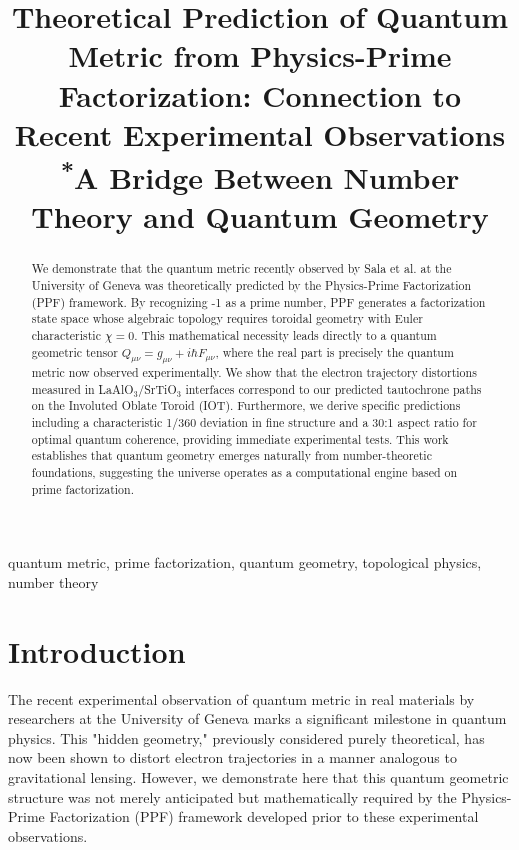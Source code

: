 \documentclass[conference]{IEEEtran}
\begin{document}
\title{Theoretical Prediction of Quantum Metric from Physics-Prime Factorization: Connection to Recent Experimental Observations\\
{\footnotesize \textsuperscript{*}A Bridge Between Number Theory and Quantum Geometry}
}

\author{
}

\maketitle

\begin{abstract}
We demonstrate that the quantum metric recently observed by Sala et al. at the University of Geneva was theoretically predicted by the Physics-Prime Factorization (PPF) framework. By recognizing -1 as a prime number, PPF generates a factorization state space whose algebraic topology requires toroidal geometry with Euler characteristic $\chi = 0$. This mathematical necessity leads directly to a quantum geometric tensor $Q_{\mu\nu} = g_{\mu\nu} + i\hbar F_{\mu\nu}$, where the real part is precisely the quantum metric now observed experimentally. We show that the electron trajectory distortions measured in LaAlO$_3$/SrTiO$_3$ interfaces correspond to our predicted tautochrone paths on the Involuted Oblate Toroid (IOT). Furthermore, we derive specific predictions including a characteristic 1/360 deviation in fine structure and a 30:1 aspect ratio for optimal quantum coherence, providing immediate experimental tests. This work establishes that quantum geometry emerges naturally from number-theoretic foundations, suggesting the universe operates as a computational engine based on prime factorization.
\end{abstract}

\begin{IEEEkeywords}
quantum metric, prime factorization, quantum geometry, topological physics, number theory
\end{IEEEkeywords}

\section{Introduction}

The recent experimental observation of quantum metric in real materials by researchers at the University of Geneva \cite{sala2025} marks a significant milestone in quantum physics. This "hidden geometry," previously considered purely theoretical, has now been shown to distort electron trajectories in a manner analogous to gravitational lensing. However, we demonstrate here that this quantum geometric structure was not merely anticipated but mathematically required by the Physics-Prime Factorization (PPF) framework developed prior to these experimental observations.
\end{document}
